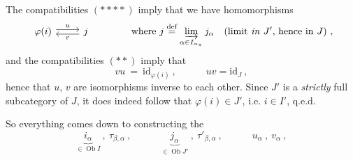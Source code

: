 \documentclass[11pt]{article}
\newcommand{\msp}[1]{\marginpar{\footnotesize [#1]}}
\newcommand{\Ob}{\operatorname{Ob}}
\begin{document}
\msp{page 315}\noindent The compatibilities $(****)$ imply that we have homomorphisms
\[
\begin{tikzcd}
\varphi(i) \arrow[r, shift left, "u"] & j \arrow[l, shift left, "v"]
\end{tikzcd}
\qquad\qquad \text{where } j \overset{\text{def}}{=} \varinjlim_{\alpha\in I_{\alpha_\pi}} j_\alpha \quad \text{(limit \textit{in} $J'$, hence in $J$)} \ ,
\]
and the compatibilities $(**)$ imply that
\[
vu \ = \ \mathrm{id}_{\varphi(i)} \ , \qquad\quad uv = \mathrm{id}_J \ , %
\]
hence that $u$, $v$ are isomorphisms inverse to each other. Since $J'$ is a \textit{strictly} full subcategory of $J$, it does indeed follow that $\varphi(i) \in J'$, i.e. $i \in I'$, q.e.d.

So everything comes down to constructing the
\[
\underbrace{i_\alpha}_{\in \Ob I} \ , \ \tau_{\beta,\alpha} \ , \qquad\quad \underbrace{j_\alpha}_{\in \Ob J'} \ , \ \tau'_{\beta,\alpha} \ , \qquad\quad u_\alpha \ , \ v_\alpha \ ,
\]
\end{document}
